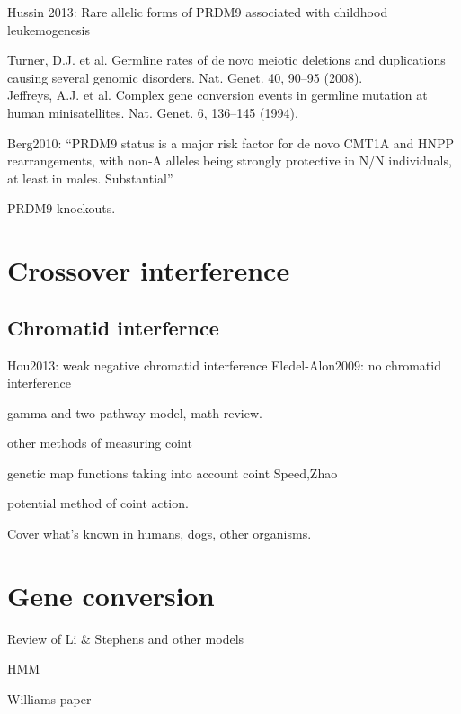 Hussin 2013: Rare allelic forms of PRDM9 associated with childhood leukemogenesis

Turner, D.J. et al. Germline rates of de novo meiotic deletions and duplications causing several genomic disorders. Nat. Genet. 40, 90–95 (2008). \\
Jeffreys, A.J. et al. Complex gene conversion events in germline mutation at human minisatellites. Nat. Genet. 6, 136–145 (1994).

Berg2010:
``PRDM9 status is a major risk factor for de novo CMT1A and HNPP rearrangements, with non-A alleles being strongly protective in N/N individuals, at least in males. Substantial''

PRDM9 knockouts.

\section{Crossover interference}
\subsection{Chromatid interfernce}
Hou2013: weak negative chromatid interference
Fledel-Alon2009: no chromatid interference

\begin{titemize}
    \item gamma and two-pathway model, math review.
    \item other methods of measuring coint
    \item genetic map functions taking into account coint Speed,Zhao
    \item potential method of coint action.
    \item Cover what's known in humans, dogs, other organisms.
\end{titemize}

\section{Gene conversion}

\begin{titemize}
    \item Review of Li \& Stephens and other models
    \item HMM
    \item Williams paper
\end{titemize}

